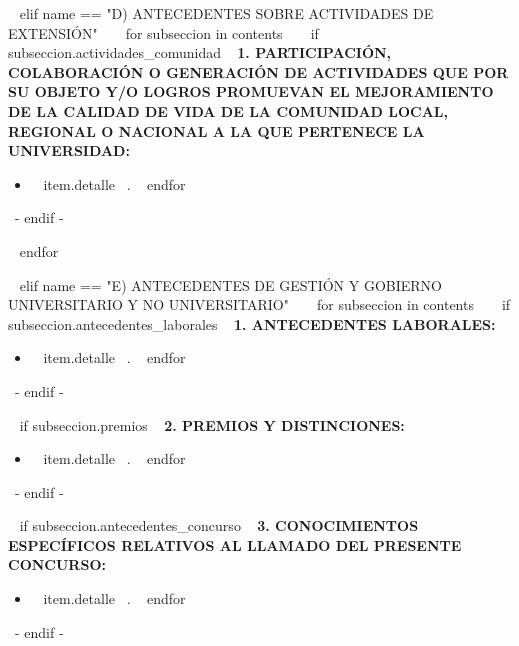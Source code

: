 ~{ elif name == "D) ANTECEDENTES SOBRE ACTIVIDADES DE EXTENSIÓN" }~
  ~{ for subseccion in contents }~
    ~{ if subseccion.actividades_comunidad }~
      \textbf{1. PARTICIPACIÓN, COLABORACIÓN O GENERACIÓN DE ACTIVIDADES QUE POR SU OBJETO Y/O LOGROS PROMUEVAN EL MEJORAMIENTO DE LA CALIDAD DE VIDA DE LA  COMUNIDAD LOCAL, REGIONAL O NACIONAL A LA QUE PERTENECE LA UNIVERSIDAD:}
      \begin{itemize}
      ~{ for item in subseccion.actividades_comunidad }~
        \item ~{{ item.detalle }}~.
        \espacioEntreItems{}
      ~{ endfor }~
      \end{itemize}
      \espacioEntreSubSecciones{}
    ~{- endif -}~

  ~{ endfor }~
  \espacioEntreSecciones{}


~{ elif name == "E) ANTECEDENTES DE GESTIÓN Y GOBIERNO UNIVERSITARIO Y NO UNIVERSITARIO" }~
  ~{ for subseccion in contents }~
    ~{ if subseccion.antecedentes_laborales }~
      \textbf{1. ANTECEDENTES LABORALES:}
      \begin{itemize}
      ~{ for item in subseccion.antecedentes_laborales }~
        \item ~{{ item.detalle }}~.
        \espacioEntreItems{}
      ~{ endfor }~
      \end{itemize}
      \espacioEntreSubSecciones{}
    ~{- endif -}~

    ~{ if subseccion.premios }~
      \textbf{2. PREMIOS Y DISTINCIONES:}
      \begin{itemize}
      ~{ for item in subseccion.premios }~
        \item ~{{ item.detalle }}~.
        \espacioEntreItems{}
      ~{ endfor }~
      \end{itemize}
      \espacioEntreSubSecciones{}
    ~{- endif -}~

    ~{ if subseccion.antecedentes_concurso }~
      \textbf{3. CONOCIMIENTOS ESPECÍFICOS RELATIVOS AL LLAMADO DEL PRESENTE CONCURSO:}
      \begin{itemize}
      ~{ for item in subseccion.antecedentes_concurso }~
        \item ~{{ item.detalle }}~.
        \espacioEntreItems{}
      ~{ endfor }~
      \end{itemize}
      \espacioEntreSubSecciones{}
    ~{- endif -}~

